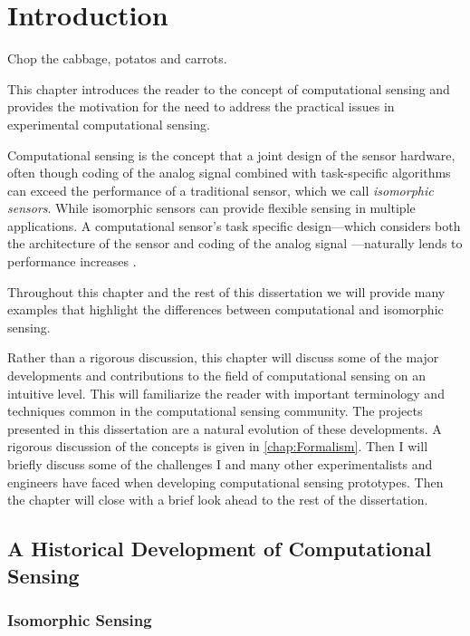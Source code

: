 

\chapter{Introduction}

Chop the \gls{cabbage}, \glspl{potato} and \glspl{carrot}.

This chapter introduces the reader to the concept of computational sensing and provides the motivation for the need to address the practical issues in experimental computational sensing. 

Computational sensing is the concept that a joint design of the sensor hardware, often though coding of the analog signal combined with task-specific algorithms can exceed the performance of a traditional sensor, which we call \emph{isomorphic sensors}. While isomorphic sensors can provide flexible sensing in multiple applications. A computational sensor's task specific design---which considers both the architecture of the sensor and coding of the analog signal ---naturally lends to performance increases \cite{neifeld2006taskSpecificSensing}. 

Throughout this chapter and the rest of this dissertation we will provide many examples that highlight the differences between computational and isomorphic sensing. 

Rather than a rigorous discussion, this chapter will discuss some of the major developments and contributions to the field of computational sensing on an intuitive level. This will familiarize the reader with important terminology and techniques common in the computational sensing community. The projects presented in this dissertation are a natural evolution of these developments. A rigorous discussion of the concepts is given in \autoref{chap:Formalism}. Then I will briefly discuss some of the challenges I and many other experimentalists and engineers have faced when developing computational sensing prototypes. Then the chapter will close with a brief look ahead to the rest of the dissertation. 


\section{A Historical Development of Computational Sensing}

\subsection{Isomorphic Sensing}

